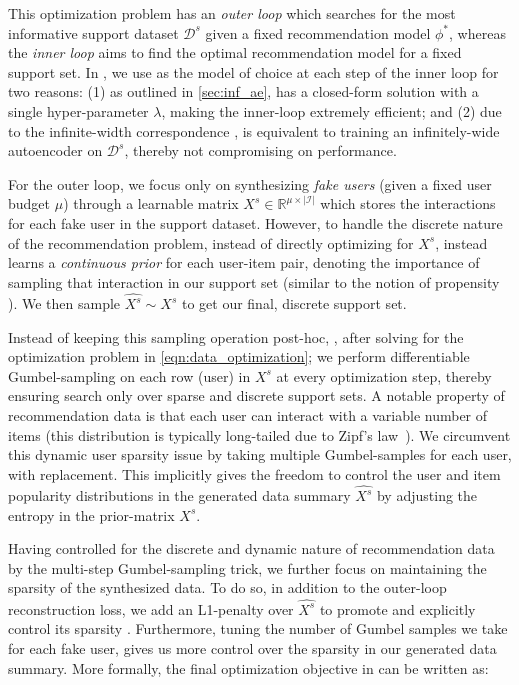 \documentclass{article}
\begin{document}
This optimization problem has an \emph{outer loop} which searches for the most informative support dataset $\mathcal{D}^s$ given a fixed recommendation model $\phi^*$, whereas the \emph{inner loop} aims to find the optimal recommendation model for a fixed support set.
In \sampler, we use \model as the model of choice at each step of the inner loop for two reasons: (1) as outlined in \cref{sec:inf_ae}, \model has a closed-form solution with a single hyper-parameter $\lambda$, making the inner-loop extremely efficient; and (2) due to the infinite-width correspondence \cite{ntk, finite_vs_infinite_3}, \model is equivalent to training an infinitely-wide autoencoder on $\mathcal{D}^s$, thereby not compromising on performance.

For the outer loop, we focus only on synthesizing \emph{fake users} (given a fixed user budget $\mu$) through a learnable matrix $X^s \in \mathbb{R}^{\mu \times |\mathcal{I}|}$ which stores the interactions for each fake user in the support dataset. However, to handle the discrete nature of the recommendation problem, instead of directly optimizing for $X^s$, \sampler instead learns a \emph{continuous prior} for each user-item pair, denoting the importance of sampling that interaction in our support set (similar to the notion of propensity \cite{sachdeva_kdd20, rec_as_treatments}). We then sample $\hat{X^s} \sim X^s$ to get our final, discrete support set.

Instead of keeping this sampling operation post-hoc, \ie, after solving for the optimization problem in \cref{eqn:data_optimization}; we perform differentiable Gumbel-sampling \cite{gumbel} on each row (user) in $X^s$ at every optimization step, thereby ensuring search only over sparse and discrete support sets. A notable property of recommendation data is that each user can interact with a variable number of items (this distribution is typically long-tailed due to Zipf's law~\cite{mlperf-dlrm}). We circumvent this dynamic user sparsity issue by taking multiple Gumbel-samples for each user, with replacement. This implicitly gives \sampler the freedom to control the user and item popularity distributions in the generated data summary $\hat{X^s}$ by adjusting the entropy in the prior-matrix $X^s$.



Having controlled for the discrete and dynamic nature of recommendation data by the multi-step Gumbel-sampling trick, we further focus on maintaining the sparsity of the synthesized data. To do so, in addition to the outer-loop reconstruction loss, we add an L1-penalty over $\hat{X^s}$ 
to promote and explicitly control its sparsity 
\cite[Chapter~3]{l1_induces_sparsity}. Furthermore, tuning the number of Gumbel samples we take for each fake user, gives us more control over the sparsity in our generated data summary. More formally, the final optimization objective in \sampler can be written as:
\end{document}
